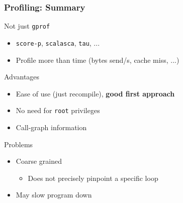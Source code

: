 \documentclass[xcolor={x11names,svgnames}]{beamer}
\begin{document}

\begin{frame}
  \frametitle{Profiling: Summary}
  
  \begin{block}{Not just \texttt{gprof}}
    \begin{itemize}
    \item \texttt{score-p}, \texttt{scalasca}, \texttt{tau}, ...
    \item Profile more than time (bytes send/s, cache miss, ...)
    \end{itemize}
  \end{block}
  
  \begin{exampleblock}{Advantages}
    \begin{itemize}
    \item Ease of use (just recompile), \textbf{good first approach}
    \item No need for \texttt{root} privileges
    \item Call-graph information
    \end{itemize}
  \end{exampleblock}
    
  \begin{alertblock}{Problems}
    \begin{itemize}
    \item Coarse grained
      \begin{itemize}
      \item Does not precisely pinpoint a specific loop
      \end{itemize}
    \item May slow program down
    \end{itemize}
  \end{alertblock}
\end{frame}

\end{document}

